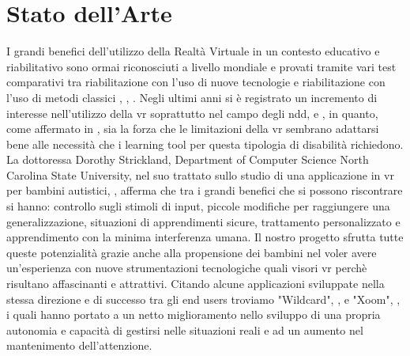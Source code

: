 \section{Stato dell'Arte} \label{sec:stato}
I grandi benefici dell'utilizzo della Realtà Virtuale in un contesto educativo e riabilitativo sono ormai riconosciuti a livello mondiale e provati tramite vari test comparativi tra riabilitazione con l'uso di nuove tecnologie e riabilitazione con l'uso di metodi classici \cite{rif3}, \cite{rif4}, \cite{rif5}. Negli ultimi anni si è registrato un incremento di interesse nell'utilizzo della \acs{vr} soprattutto nel campo degli \acs{ndd}, \cite{rif6} e \cite{rif7}, in quanto, come affermato in \cite{rif11}, sia la forza che le limitazioni della \acl{vr} sembrano adattarsi bene alle necessità che i learning tool per questa tipologia di disabilità richiedono. La dottoressa Dorothy Strickland, Department of Computer Science
North Carolina State University, nel suo trattato sullo studio di una applicazione in \acs{vr} per bambini autistici, \cite{rif12}, afferma che tra i grandi benefici che si possono riscontrare si hanno: controllo sugli stimoli di input, piccole modifiche per raggiungere una generalizzazione, situazioni di apprendimenti sicure, trattamento personalizzato e apprendimento con la minima interferenza umana. Il nostro progetto sfrutta tutte queste potenzialità grazie anche alla propensione dei bambini nel voler avere un'esperienza con nuove strumentazioni tecnologiche quali visori \acs{vr} perchè risultano affascinanti e attrattivi. Citando alcune applicazioni sviluppate nella stessa direzione e di successo tra gli end users troviamo "Wildcard", \cite{rif13}, e "Xoom", \cite{rif14}, i quali hanno portato a un netto miglioramento nello sviluppo di una propria autonomia e capacità di gestirsi nelle situazioni reali e ad un aumento nel mantenimento dell'attenzione.\\
